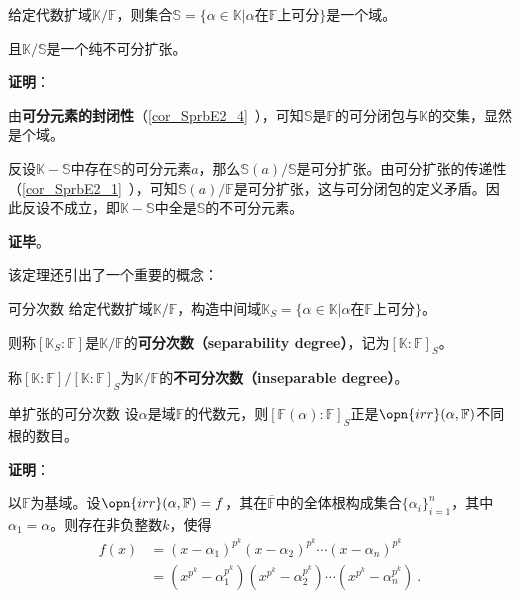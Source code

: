 \begin{theorem}{}\label{the_PInsEx_3}
给定代数扩域$\mathbb{K}/\mathbb{F}$，则集合$\mathbb{S}=\{\alpha\in\mathbb{K}|\alpha\text{在}\mathbb{F}\text{上可分}\}$是一个域。

且$\mathbb{K}/\mathbb{S}$是一个纯不可分扩张。
\end{theorem}

\textbf{证明}：

由\textbf{可分元素的封闭性}（\autoref{cor_SprbE2_4}~），可知$\mathbb{S}$是$\mathbb{F}$的可分闭包与$\mathbb{K}$的交集，显然是个域。

反设$\mathbb{K}-\mathbb{S}$中存在$\mathbb{S}$的可分元素$a$，那么$\mathbb{S}(a)/\mathbb{S}$是可分扩张。由可分扩张的传递性（\autoref{cor_SprbE2_1}~），可知$\mathbb{S}(a)/\mathbb{F}$是可分扩张，这与可分闭包的定义矛盾。因此反设不成立，即$\mathbb{K}-\mathbb{S}$中全是$\mathbb{S}$的不可分元素。

\textbf{证毕}。

该定理还引出了一个重要的概念：

\begin{definition}{可分次数}
给定代数扩域$\mathbb{K}/\mathbb{F}$，构造中间域$\mathbb{K}_S=\{\alpha\in\mathbb{K}|\alpha\text{在}\mathbb{F}\text{上可分}\}$。

则称$[\mathbb{K}_S:\mathbb{F}]$是$\mathbb{K}/\mathbb{F}$的\textbf{可分次数（separability degree）}，记为$[\mathbb{K}:\mathbb{F}]_S$。

称$[\mathbb{K}:\mathbb{F}] / [\mathbb{K}:\mathbb{F}]_S$为$\mathbb{K}/\mathbb{F}$的\textbf{不可分次数（inseparable degree）}。
\end{definition}


\begin{theorem}{单扩张的可分次数}\label{the_PInsEx_4}
设$\alpha$是域$\mathbb{F}$的代数元，则$[\mathbb{F}(\alpha):\mathbb{F}]_S$正是$\opn{irr}(\alpha, \mathbb{F})$不同根的数目。
\end{theorem}

\textbf{证明}：

以$\mathbb{F}$为基域。设$\opn{irr}(\alpha, \mathbb{F})=f$，其在$\overline{\mathbb{F}}$中的全体根构成集合$\{\alpha_i\}_{i=1}^n$，其中$\alpha_1=\alpha$。则存在非负整数$k$，使得
\begin{equation}
\begin{aligned}
f(x) &= (x-\alpha_1)^{p^k}(x-\alpha_2)^{p^k}\cdots(x-\alpha_n)^{p^k}\\
&=(x^{p^k}-\alpha^{p^k}_1)(x^{p^k}-\alpha^{p^k}_2)\cdots(x^{p^k}-\alpha^{p^k}_n)~.
\end{aligned}
\end{equation}


